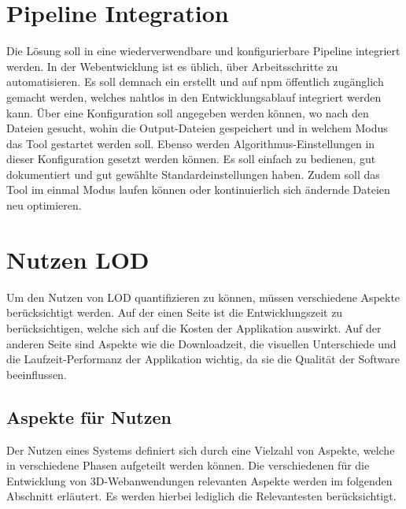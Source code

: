 
\section{Pipeline Integration}
Die Lösung soll in eine wiederverwendbare und konfigurierbare Pipeline integriert werden.
In der Webentwicklung ist es üblich, über  Arbeitsschritte zu automatisieren. Es soll demnach ein  erstellt und auf \gls{npm} öffentlich zugänglich gemacht werden, welches nahtlos in den Entwicklungsablauf integriert werden kann. Über eine Konfiguration soll angegeben werden können, wo nach den  Dateien gesucht, wohin die Output-Dateien gespeichert und in welchem Modus das Tool gestartet werden soll. Ebenso werden Algorithmus-Einstellungen in dieser Konfiguration gesetzt werden können. Es soll einfach zu bedienen, gut dokumentiert und gut gewählte Standardeinstellungen haben. Zudem soll das Tool im einmal Modus laufen können oder kontinuierlich sich ändernde Dateien neu optimieren.

\section{Nutzen LOD}
Um den Nutzen von LOD quantifizieren zu können, müssen verschiedene Aspekte berücksichtigt werden. Auf der einen Seite ist die Entwicklungszeit zu berücksichtigen, welche sich auf die Kosten der Applikation auswirkt. Auf der anderen Seite sind Aspekte wie die Downloadzeit, die visuellen Unterschiede und die Laufzeit-Performanz der Applikation wichtig, da sie die Qualität der Software beeinflussen.

\subsection{Aspekte für Nutzen}

Der Nutzen eines Systems definiert sich durch eine Vielzahl von Aspekte, welche in verschiedene Phasen aufgeteilt werden können. Die verschiedenen für die Entwicklung von 3D-Webanwendungen relevanten Aspekte werden im folgenden Abschnitt erläutert. Es werden hierbei lediglich die Relevantesten berücksichtigt.

